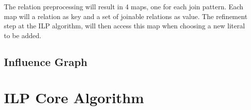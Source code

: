 The relation preprocessing will result in 4 maps, one for each join pattern. Each map will a relation as key and a set of joinable relations as value. The refinement step at the ILP algorithm, will then access this map when choosing a new literal to be added.


\subsection{Influence Graph}

\section{ILP Core Algorithm}


